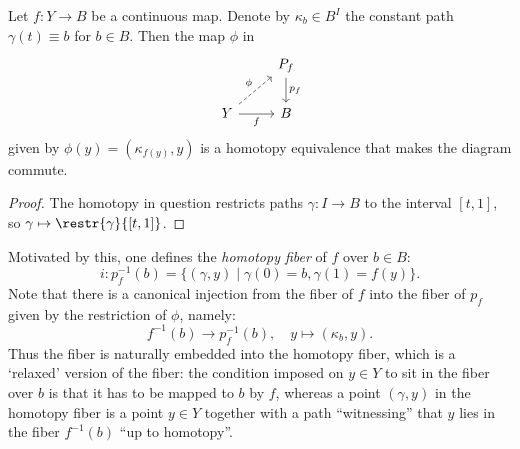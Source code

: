 \begin{cor}
    Let $f:Y\to B$ be a continuous map. Denote by $\kappa_b\in B^I$ the constant path $\gamma(t)\equiv b$ for $b\in B$. Then the map $\phi$ in 
    \[
    \begin{tikzcd}[every matrix/.append style={name=m}]
       & P_f\arrow[d,"p_f"]\\
       Y\arrow[ur,"\phi",dashed]\arrow[r,"f",swap] & B
    \end{tikzcd}
    \]
    given by $\phi(y)=(\kappa_{f(y)},y)$ is a homotopy equivalence that makes the diagram commute. 
\end{cor}
\begin{proof}
    The homotopy in question restricts paths $\gamma:I\to B$ to the interval $[t,1]$, so $\gamma\mapsto \restr{\gamma}{[t,1]}$.
\end{proof}

Motivated by this, one defines the \emph{homotopy fiber} of $f$ over $b\in B$:
\[i: p_f^{-1}(b)=\{(\gamma,y)\mid \gamma(0)=b, \gamma(1)=f(y)\}.\]
Note that there is a canonical injection from the fiber of $f$ into the fiber of $p_f$ given by the restriction of $\phi$, namely:
\[f^{-1}(b)\to p_f^{-1}(b),\quad y\mapsto (\kappa_{b},y).\]
Thus the fiber is naturally embedded into the homotopy fiber, which is a `relaxed' version of the fiber: the condition imposed on $y\in Y$ to sit in the fiber over $b$ is that it has to be mapped to $b$ by $f$, whereas a point $(\gamma,y)$ in the homotopy fiber is a point $y\in Y$ together with a path ``witnessing'' that $y$ lies in the fiber $f^{-1}(b)$ ``up to homotopy''.

